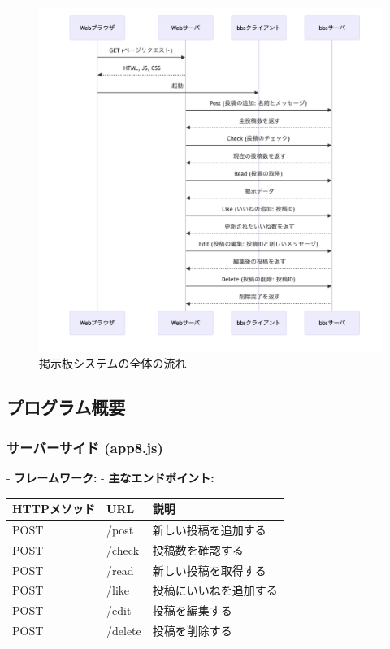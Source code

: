 \documentclass[uplatex,dvipdfmx]{jsarticle}
\begin{document}
\begin{figure}[H]
   \centering
   \includegraphics[width=15cm]{nagare.png}
   \caption{掲示板システムの全体の流れ}
   \label{nagare}
\end{figure}


\subsection*{プログラム概要}

\subsubsection*{サーバーサイド (app8.js)}
- \textbf{フレームワーク:} 
- \textbf{主なエンドポイント:}
  \begin{tabular}{|l|l|l|}
  \hline
  HTTPメソッド & URL        & 説明 \\
  \hline
  POST         & /post      & 新しい投稿を追加する \\
  POST         & /check     & 投稿数を確認する \\
  POST         & /read      & 新しい投稿を取得する \\
  POST         & /like      & 投稿にいいねを追加する \\
  POST         & /edit      & 投稿を編集する \\
  POST         & /delete    & 投稿を削除する \\
  \hline
  \end{tabular}
\end{document}
